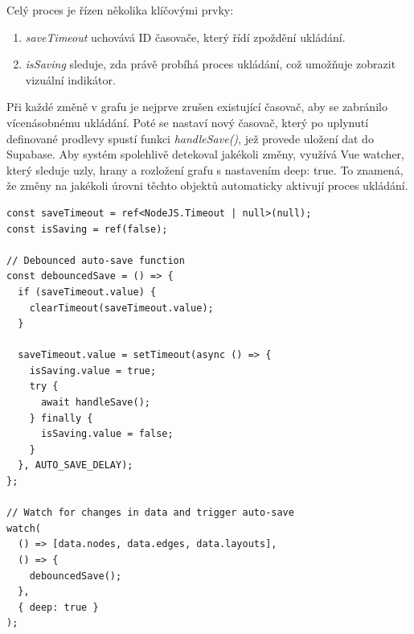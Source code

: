 Celý proces je řízen několika klíčovými prvky:
\begin{enumerate}
    \item \textit{saveTimeout} uchovává ID časovače, který řídí zpoždění ukládání.
    \item \textit{isSaving} sleduje, zda právě probíhá proces ukládání, což umožňuje zobrazit vizuální indikátor.
        
\end{enumerate}

Při každé změně v grafu je nejprve zrušen existující časovač, aby se zabránilo vícenásobnému ukládání. Poté se nastaví nový časovač, který po uplynutí definované prodlevy spustí funkci \textit{handleSave()}, jež provede uložení dat do Supabase.
\newline
Aby systém spolehlivě detekoval jakékoli změny, využívá Vue watcher, který sleduje uzly, hrany a rozložení grafu s nastavením deep: true. To znamená, že změny na jakékoli úrovni těchto objektů automaticky aktivují proces ukládání.
\begin{lstlisting}[style=JavaScript, firstnumber = 165, caption={components/MapNetwork.vue, automatické ukládání}, label={autosave}]
const saveTimeout = ref<NodeJS.Timeout | null>(null);
const isSaving = ref(false);

// Debounced auto-save function
const debouncedSave = () => {
  if (saveTimeout.value) {
    clearTimeout(saveTimeout.value);
  }
  
  saveTimeout.value = setTimeout(async () => {
    isSaving.value = true;
    try {
      await handleSave();
    } finally {
      isSaving.value = false;
    }
  }, AUTO_SAVE_DELAY);
};

// Watch for changes in data and trigger auto-save
watch(
  () => [data.nodes, data.edges, data.layouts],
  () => {
    debouncedSave();
  },
  { deep: true }
);
\end{lstlisting}